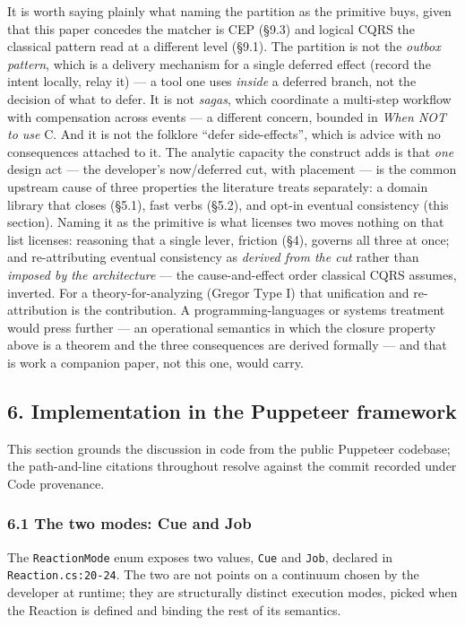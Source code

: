 \documentclass[
]{article}
\let\origtexttt\texttt%
\renewcommand{\texttt}[1]{\origtexttt{\seqsplit{#1}}}%
\let\texttt\origtexttt%
\begin{document}
It is worth saying plainly what naming the partition as the primitive
buys, given that this paper concedes the matcher is CEP (§9.3) and
logical CQRS the classical pattern read at a different level (§9.1). The
partition is not the \emph{outbox pattern}, which is a delivery
mechanism for a single deferred effect (record the intent locally, relay
it) --- a tool one uses \emph{inside} a deferred branch, not the
decision of what to defer. It is not \emph{sagas}, which coordinate a
multi-step workflow with compensation across events --- a different
concern, bounded in \emph{When NOT to use} C. And it is not the folklore
``defer side-effects'', which is advice with no consequences attached to
it. The analytic capacity the construct adds is that \emph{one} design
act --- the developer's now/deferred cut, with placement --- is the
common upstream cause of three properties the literature treats
separately: a domain library that closes (§5.1), fast verbs (§5.2), and
opt-in eventual consistency (this section). Naming it as the primitive
is what licenses two moves nothing on that list licenses: reasoning that
a single lever, friction (§4), governs all three at once; and
re-attributing eventual consistency as \emph{derived from the cut}
rather than \emph{imposed by the architecture} --- the cause-and-effect
order classical CQRS assumes, inverted. For a theory-for-analyzing
(Gregor Type I) that unification and re-attribution is the contribution.
A programming-languages or systems treatment would press further --- an
operational semantics in which the closure property above is a theorem
and the three consequences are derived formally --- and that is work a
companion paper, not this one, would carry.

\subsection{6. Implementation in the Puppeteer
framework}\label{implementation-in-the-puppeteer-framework}

This section grounds the discussion in code from the public Puppeteer
codebase; the path-and-line citations throughout resolve against the
commit recorded under Code provenance.

\subsubsection{6.1 The two modes: Cue and
Job}\label{the-two-modes-cue-and-job}

The \texttt{ReactionMode} enum exposes two values, \texttt{Cue} and
\texttt{Job}, declared in \texttt{Reaction.cs:20-24}. The two are not
points on a continuum chosen by the developer at runtime; they are
structurally distinct execution modes, picked when the Reaction is
defined and binding the rest of its semantics.
\end{document}

